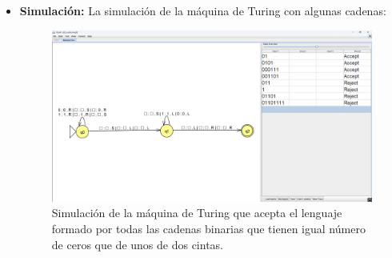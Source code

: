 \documentclass[11pt]{report}
\begin{document}
\begin{itemize}
  \item \textbf{Simulación:} La simulación de la máquina de Turing con algunas cadenas:
        \begin{figure}[H]
          \centering
          \includegraphics[scale=0.3]{img/MT_05_multiple_ribbon_simulation.png}
          \caption{Simulación de la máquina de Turing que acepta el lenguaje formado por todas las cadenas binarias que tienen igual número de ceros que de unos de dos cintas.}
          \label{fig:simulacion de la maquina de turing que acepta el lenguaje formado por todas las cadenas binarias que tienen igual número de ceros que de unos de dos cintas}
        \end{figure}
\end{itemize}
\end{document}
